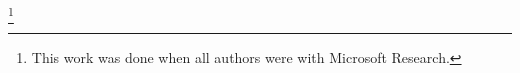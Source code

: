 \documentclass[sigconf,9pt]{acmart}
\numberwithin{equation}{section}
\begin{document}
\thanks{This work was done when all authors were with Microsoft Research.}

\maketitle














{\footnotesize

}

\appendix

\end{document}
